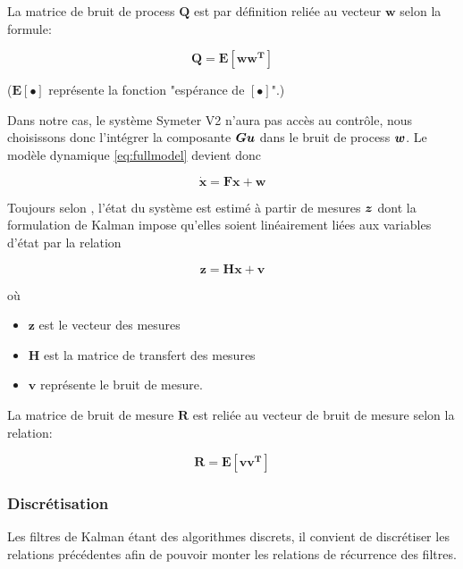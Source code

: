 \documentclass[12pt,a4paper]{report}
\begin{document}
	La matrice de bruit de process \(\boldsymbol{Q}\) est par définition reliée au vecteur \(\boldsymbol{w}\) selon la formule:

	\begin{equation}
		\boldsymbol{Q = E[ww^T]}
	\end{equation}

	($\boldsymbol{E[\bullet]}$ représente la fonction "espérance de \([\bullet]\)".)
	
	\para Dans notre cas, le système Symeter V2 n'aura pas accès au contrôle, nous choisissons donc l'intégrer la composante $\boldsymbol{Gu}$ dans le bruit de process $\boldsymbol{w}$. Le modèle dynamique \ref{eq:fullmodel} devient donc 
	
	\begin{equation}
		\label{eq:actualmodel}
			\boldsymbol{
			\dot{x} = Fx + w
		}
	\end{equation}

	\para Toujours selon \cite{zarchan_fundamentals_2009}, l'état du système est estimé à partir de mesures $\boldsymbol{z}$ dont la formulation de Kalman impose qu'elles soient linéairement liées aux variables d'état par la relation 

	\begin{equation}
		\label{eq:mesure_cont}
		\boldsymbol{z=Hx + v}
	\end{equation}

	où

	\begin{itemize}
		\item
		\(\boldsymbol{z}\) est le vecteur des mesures
		\item
		\(\boldsymbol{H}\) est la matrice de transfert des mesures
		\item
		\(\boldsymbol{v}\) représente le bruit de mesure.
	\end{itemize}

	La matrice de bruit de mesure \(\boldsymbol{R}\) est reliée au vecteur	de bruit de mesure selon la relation:

	\begin{equation}
		\label{eq:covmesur_cont}
		\boldsymbol{R = E[vv^T]}
	\end{equation}
	
	\subsubsection{Discrétisation}
	Les filtres de Kalman étant des algorithmes discrets, il convient de discrétiser les relations précédentes afin de pouvoir monter les relations de récurrence des filtres.
	
\end{document}
